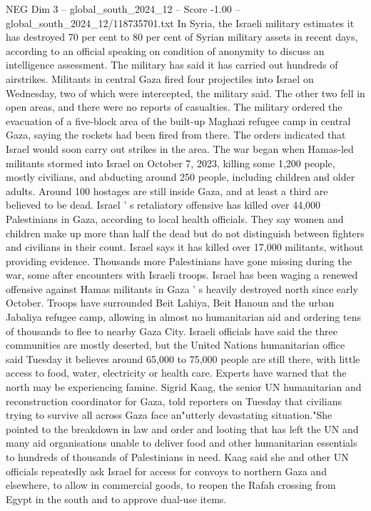 \begin{textsample}{NEG Dim 3 – global\_south\_2024\_12 – Score -1.00 – global\_south\_2024\_12/118735701.txt}
In Syria, the Israeli military estimates it has destroyed 70 per cent to 80 per cent of Syrian military assets in recent days, according to an official speaking on condition of anonymity to discuss an intelligence assessment.
The military has said it has carried out hundreds of airstrikes.
Militants in central Gaza fired four projectiles into Israel on Wednesday, two of which were intercepted, the military said.
The other two fell in open areas, and there were no reports of casualties.
The military ordered the evacuation of a five-block area of the built-up Maghazi refugee camp in central Gaza, saying the rockets had been fired from there.
The orders indicated that Israel would soon carry out strikes in the area.
The war began when Hamas-led militants stormed into Israel on October 7, 2023, killing some 1,200 people, mostly civilians, and abducting around 250 people, including children and older adults.
Around 100 hostages are still inside Gaza, and at least a third are believed to be dead.
Israel ' s retaliatory offensive has killed over 44,000 Palestinians in Gaza, according to local health officials.
They say women and children make up more than half the dead but do not distinguish between fighters and civilians in their count.
Israel says it has killed over 17,000 militants, without providing evidence.
Thousands more Palestinians have gone missing during the war, some after encounters with Israeli troops.
Israel has been waging a renewed offensive against Hamas militants in Gaza ' s heavily destroyed north since early October.
Troops have surrounded Beit Lahiya, Beit Hanoun and the urban Jabaliya refugee camp, allowing in almost no humanitarian aid and ordering tens of thousands to flee to nearby Gaza City.
Israeli officials have said the three communities are mostly deserted, but the United Nations humanitarian office said Tuesday it believes around 65,000 to 75,000 people are still there, with little access to food, water, electricity or health care.
Experts have warned that the north may be experiencing famine.
Sigrid Kaag, the senior UN humanitarian and reconstruction coordinator for Gaza, told reporters on Tuesday that civilians trying to survive all across Gaza face an"utterly devastating situation."She pointed to the breakdown in law and order and looting that has left the UN and many aid organisations unable to deliver food and other humanitarian essentials to hundreds of thousands of Palestinians in need.
Kaag said she and other UN officials repeatedly ask Israel for access for convoys to northern Gaza and elsewhere, to allow in commercial goods, to reopen the Rafah crossing from Egypt in the south and to approve dual-use items.

\end{textsample}
